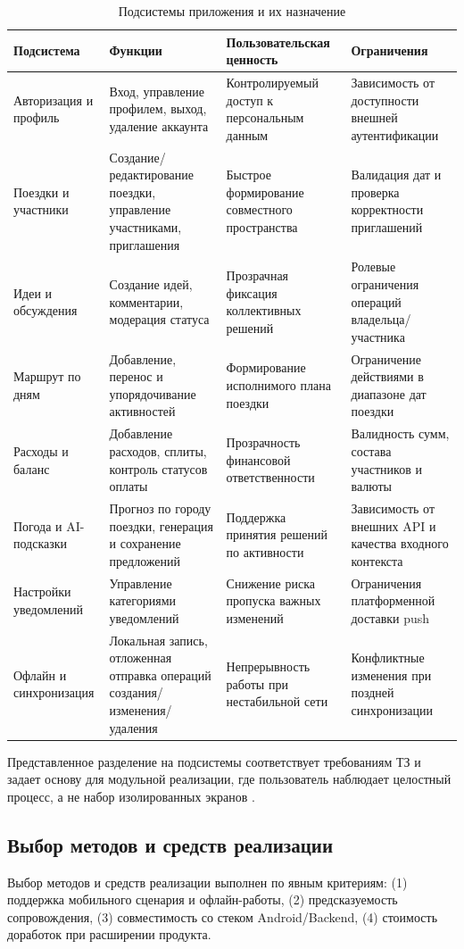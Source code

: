\begin{table}[H]
\centering
\small
\caption{Подсистемы приложения и их назначение}
\begin{tabular}{|p{2.7cm}|p{3.3cm}|p{3.3cm}|p{3.3cm}|}
\hline
Подсистема & Функции & Пользовательская ценность & Ограничения \\ 
\hline
Авторизация и профиль & Вход, управление профилем, выход, удаление аккаунта & Контролируемый доступ к персональным данным & Зависимость от доступности внешней аутентификации \\ 
\hline
Поездки и участники & Создание/редактирование поездки, управление участниками, приглашения & Быстрое формирование совместного пространства & Валидация дат и проверка корректности приглашений \\ 
\hline
Идеи и обсуждения & Создание идей, комментарии, модерация статуса & Прозрачная фиксация коллективных решений & Ролевые ограничения операций владельца/участника \\ 
\hline
Маршрут по дням & Добавление, перенос и упорядочивание активностей & Формирование исполнимого плана поездки & Ограничение действиями в диапазоне дат поездки \\ 
\hline
Расходы и баланс & Добавление расходов, сплиты, контроль статусов оплаты & Прозрачность финансовой ответственности & Валидность сумм, состава участников и валюты \\ 
\hline
Погода и AI-подсказки & Прогноз по городу поездки, генерация и сохранение предложений & Поддержка принятия решений по активности & Зависимость от внешних API и качества входного контекста \\ 
\hline
Настройки уведомлений & Управление категориями уведомлений & Снижение риска пропуска важных изменений & Ограничения платформенной доставки push \\ 
\hline
Офлайн и синхронизация & Локальная запись, отложенная отправка операций создания/изменения/удаления & Непрерывность работы при нестабильной сети & Конфликтные изменения при поздней синхронизации \\ 
\hline
\end{tabular}
\end{table}

Представленное разделение на подсистемы соответствует требованиям ТЗ и задает основу для модульной реализации, где пользователь наблюдает целостный процесс, а не набор изолированных экранов .

\subsection{Выбор методов и средств реализации}
Выбор методов и средств реализации выполнен по явным критериям: (1) поддержка мобильного сценария и офлайн-работы, (2) предсказуемость сопровождения, (3) совместимость со стеком Android/Backend, (4) стоимость доработок при расширении продукта.

